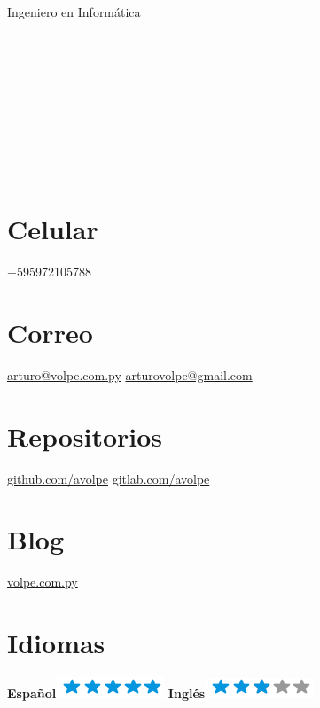 \documentclass[]{friggeri-cv}
\begin{document}
{Ingeniero en Informática}


\begin{aside}
	\section{}~
    \section{}~
    \section{}~
    \section{Celular}
        +595972105788
        ~
    \section{Correo}
        \href{mailto:arturo@volpe.com.py}{arturo@volpe.com.py}
        \href{mailto:arturovolpe@gmail.com}{arturovolpe@gmail.com}
        ~
    \section{Repositorios}
        \href{https://github.com/avolpe}{github.com/avolpe}
        \href{https://gitlab.com/avolpe}{gitlab.com/avolpe}
        ~
    \section{Blog}
        \href{https://www.volpe.com.py}{volpe.com.py}
        ~
\section{Idiomas}
\textbf{Español}\includegraphics[scale=0.40]{img/5stars.png}
\textbf{Inglés}\includegraphics[scale=0.40]{img/3stars.png}
\end{aside}
\end{document}
